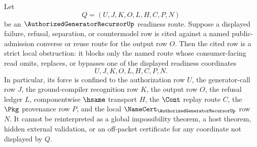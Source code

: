 \begin{corollary}
\label{cor:authorized-generator-recursor-readiness-route-public-admission-strict-obstruction}
Let
$$
Q=(U,J,K,O,L,H,C,P,N)
$$
be an $\AuthorizedGeneratorRecursorUp$ readiness route. Suppose a displayed
failure, refusal, separation, or countermodel row is cited against a named
public-admission converse or reuse route for the output row $O$. Then the cited
row is a strict local obstruction: it blocks only the named route whose
consumer-facing read omits, replaces, or bypasses one of the displayed
readiness coordinates
$$
U,J,K,O,L,H,C,P,N.
$$
In particular, its force is confined to the authorization row $U$, the
generator-call row $J$, the ground-compiler recognition row $K$, the output row
$O$, the refusal ledger $L$, componentwise $\hsame$ transport $H$, the
$\Cont$ replay route $C$, the $\Pkg$ provenance row $P$, and the local
$\NameCert_{\AuthorizedGeneratorRecursorUp}$ row $N$. It cannot be
reinterpreted as a global impossibility theorem, a host theorem, hidden
external validation, or an off-packet certificate for any coordinate not
displayed by $Q$.
\end{corollary}
